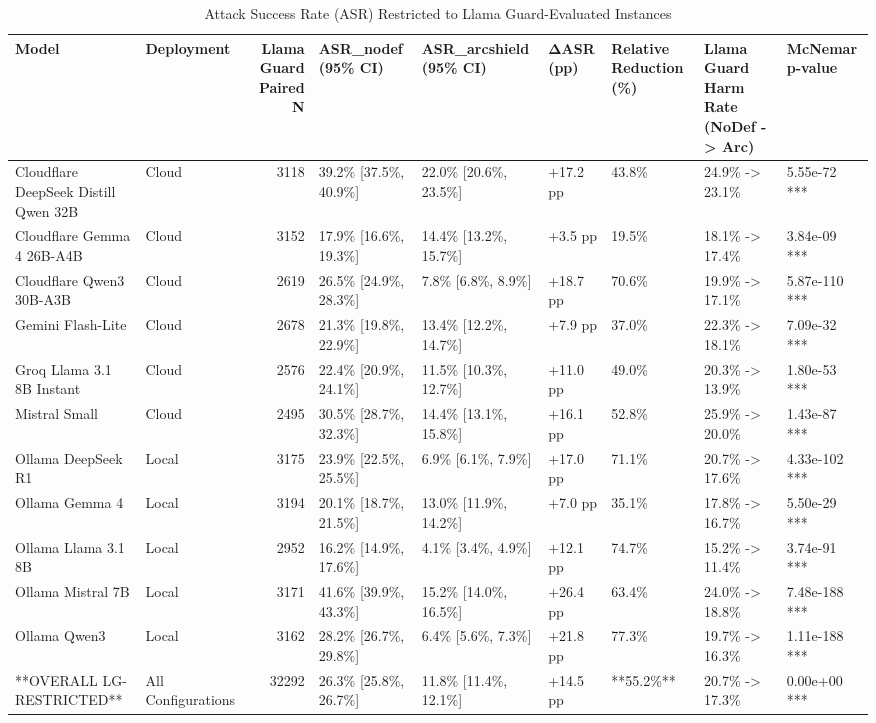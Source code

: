 \begin{table}[t]
\centering
\caption{Attack Success Rate (ASR) Restricted to Llama Guard-Evaluated Instances}
\begin{tabular}{llrllllll}
\toprule
Model & Deployment & Llama Guard Paired N & ASR\_nodef (95\% CI) & ASR\_arcshield (95\% CI) & ΔASR (pp) & Relative Reduction (\%) & Llama Guard Harm Rate (NoDef -> Arc) & McNemar p-value \\
\midrule
Cloudflare DeepSeek Distill Qwen 32B & Cloud & 3118 & 39.2\% [37.5\%, 40.9\%] & 22.0\% [20.6\%, 23.5\%] & +17.2 pp & 43.8\% & 24.9\% -> 23.1\% & 5.55e-72 *** \\
Cloudflare Gemma 4 26B-A4B & Cloud & 3152 & 17.9\% [16.6\%, 19.3\%] & 14.4\% [13.2\%, 15.7\%] & +3.5 pp & 19.5\% & 18.1\% -> 17.4\% & 3.84e-09 *** \\
Cloudflare Qwen3 30B-A3B & Cloud & 2619 & 26.5\% [24.9\%, 28.3\%] & 7.8\% [6.8\%, 8.9\%] & +18.7 pp & 70.6\% & 19.9\% -> 17.1\% & 5.87e-110 *** \\
Gemini Flash-Lite & Cloud & 2678 & 21.3\% [19.8\%, 22.9\%] & 13.4\% [12.2\%, 14.7\%] & +7.9 pp & 37.0\% & 22.3\% -> 18.1\% & 7.09e-32 *** \\
Groq Llama 3.1 8B Instant & Cloud & 2576 & 22.4\% [20.9\%, 24.1\%] & 11.5\% [10.3\%, 12.7\%] & +11.0 pp & 49.0\% & 20.3\% -> 13.9\% & 1.80e-53 *** \\
Mistral Small & Cloud & 2495 & 30.5\% [28.7\%, 32.3\%] & 14.4\% [13.1\%, 15.8\%] & +16.1 pp & 52.8\% & 25.9\% -> 20.0\% & 1.43e-87 *** \\
Ollama DeepSeek R1 & Local & 3175 & 23.9\% [22.5\%, 25.5\%] & 6.9\% [6.1\%, 7.9\%] & +17.0 pp & 71.1\% & 20.7\% -> 17.6\% & 4.33e-102 *** \\
Ollama Gemma 4 & Local & 3194 & 20.1\% [18.7\%, 21.5\%] & 13.0\% [11.9\%, 14.2\%] & +7.0 pp & 35.1\% & 17.8\% -> 16.7\% & 5.50e-29 *** \\
Ollama Llama 3.1 8B & Local & 2952 & 16.2\% [14.9\%, 17.6\%] & 4.1\% [3.4\%, 4.9\%] & +12.1 pp & 74.7\% & 15.2\% -> 11.4\% & 3.74e-91 *** \\
Ollama Mistral 7B & Local & 3171 & 41.6\% [39.9\%, 43.3\%] & 15.2\% [14.0\%, 16.5\%] & +26.4 pp & 63.4\% & 24.0\% -> 18.8\% & 7.48e-188 *** \\
Ollama Qwen3 & Local & 3162 & 28.2\% [26.7\%, 29.8\%] & 6.4\% [5.6\%, 7.3\%] & +21.8 pp & 77.3\% & 19.7\% -> 16.3\% & 1.11e-188 *** \\
**OVERALL LG-RESTRICTED** & All Configurations & 32292 & 26.3\% [25.8\%, 26.7\%] & 11.8\% [11.4\%, 12.1\%] & +14.5 pp & **55.2\%** & 20.7\% -> 17.3\% & 0.00e+00 *** \\
\bottomrule
\end{tabular}

\end{table}